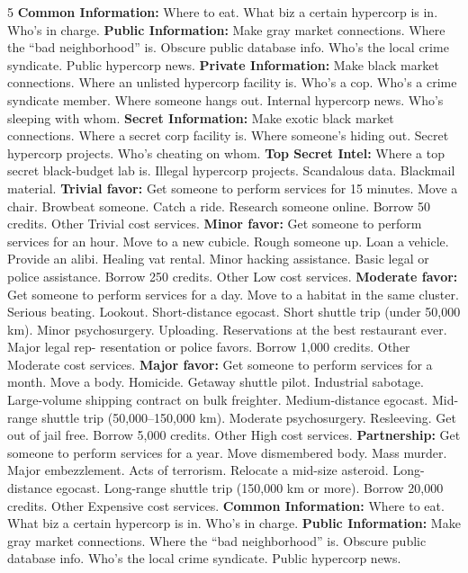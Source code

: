 5
\textbf{Common Information:} Where to eat. What biz a certain 
hypercorp is in. Who's in charge.
\textbf{Public Information:} Make gray market connections. 
Where the ``bad neighborhood'' is. Obscure public 
database info. Who's the local crime syndicate. Public 
hypercorp news.
\textbf{Private Information:} Make black market connections. 
Where an unlisted hypercorp facility is. Who's a cop. Who's 
a crime syndicate member. Where someone hangs out. 
Internal hypercorp news. Who's sleeping with whom.
\textbf{Secret Information:} Make exotic black market 
connections. Where a secret corp facility is. Where 
someone's hiding out. Secret hypercorp projects. Who's 
cheating on whom.
\textbf{Top Secret Intel: }Where a top secret black-budget 
lab is. Illegal hypercorp projects. Scandalous data. 
Blackmail material.
\textbf{Trivial favor:} Get someone to perform services for 15 
minutes. Move a chair. Browbeat someone. Catch a ride. 
Research someone online. Borrow 50 credits. Other Trivial 
cost services.
\textbf{Minor favor:} Get someone to perform services for an 
hour. Move to a new cubicle. Rough someone up. Loan a 
vehicle. Provide an alibi. Healing vat rental. Minor hacking 
assistance. Basic legal or police assistance. Borrow 250 
credits. Other Low cost services.
\textbf{Moderate favor:} Get someone to perform services 
for a day. Move to a habitat in the same cluster. Serious 
beating. Lookout. Short-distance egocast. Short shuttle 
trip (under 50,000 km). Minor psychosurgery. Uploading. 
Reservations at the best restaurant ever. Major legal rep-
resentation or police favors. Borrow 1,000 credits. Other 
Moderate cost services.
\textbf{Major favor:} Get someone to perform services for a 
month. Move a body. Homicide. Getaway shuttle pilot. 
Industrial sabotage. Large-volume shipping contract on 
bulk freighter. Medium-distance egocast. Mid-range shuttle 
trip (50,000–150,000 km). Moderate psychosurgery. 
Resleeving. Get out of jail free. Borrow 5,000 credits. Other 
High cost services.
\textbf{Partnership:} Get someone to perform services for a 
year. Move dismembered body. Mass murder. Major 
embezzlement. Acts of terrorism. Relocate a mid-size 
asteroid. Long-distance egocast. Long-range shuttle trip 
(150,000 km or more). Borrow 20,000 credits. Other 
Expensive cost services.
\textbf{Common Information:} Where to eat. What biz a certain 
hypercorp is in. Who's in charge.
\textbf{Public Information:} Make gray market connections. 
Where the ``bad neighborhood'' is. Obscure public 
database info. Who's the local crime syndicate. Public 
hypercorp news.
